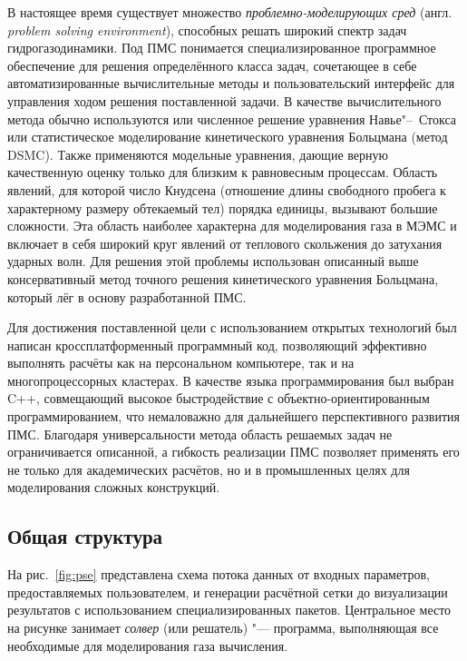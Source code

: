 В настоящее время существует множество \textit{проблемно-моделирующих сред} (англ. \textit{problem solving environment}),
способных решать широкий спектр задач гидрогазодинамики.
Под ПМС понимается специализированное программное обеспечение для решения определённого класса задач,
сочетающее в себе автоматизированные вычислительные методы и пользовательский интерфейс для управления ходом решения поставленной задачи.
В качестве вычислительного метода обычно используются или численное решение уравне­ния Навье"--~Стокса
или статистическое моделирование кинетического уравнения Больцмана (метод DSMC).
Также применяются модельные уравнения, дающие верную качественную оценку только для близким к равновесным процессам.
Область явлений, для которой число Кнудсена (отношение длины свободного пробега к характерному размеру обтекаемый тел) порядка единицы,
вызывают большие сложности. Эта область наиболее характерна для моделирования газа в МЭМС и
включает в себя широкий круг явлений от теплового скольжения до затухания ударных волн. 
Для решения этой проблемы использован описанный выше консервативный метод точного решения кинетического уравнения Больцмана,
который лёг в основу разработанной ПМС.

Для достижения поставленной цели с использованием открытых технологий был написан кроссплатформенный программный код,
позволяющий эффективно выполнять расчёты как на персональном компьютере, так и на многопроцессорных кластерах.
В качестве языка программирования был выбран C++, совмещающий высокое быстродействие с объектно-ориентированным программированием,
что немаловажно для дальнейшего перспективного развития ПМС. 
Благодаря универсальности метода область решаемых задач не ограничивается описанной,
а гибкость реализации ПМС позволяет применять его не только для академических расчётов,
но и в промышленных целях для моделирования сложных конструкций.

\subsection{Общая структура}

На рис.~\ref{fig:pse} представлена схема потока данных от входных параметров, предоставляемых пользователем,
и генерации расчётной сетки до визуализации результатов с использованием специализированных пакетов.
Центральное место на рисунке занимает \textit{солвер} (или решатель) "--- программа,
выполняющая все необходимые для моделирования газа вычисления.

